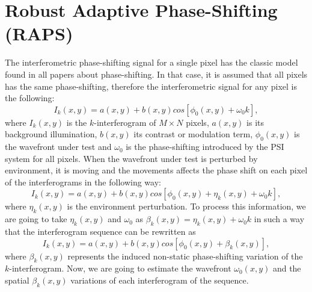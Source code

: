 \section{Robust Adaptive Phase-Shifting (RAPS)}
The interferometric phase-shifting signal for a single pixel has the classic
model found in all papers about phase-shifting. In that case, it is assumed that
all pixels has the same phase-shifting, therefore the interferometric signal for
any pixel is the following:
\begin{equation}
  I_k(x,y) = a(x,y)+b(x,y)cos[\phi_0(x,y) + \omega_0 k],
\end{equation}
where $I_k(x,y)$ is the $k$-interferogram of $M\times N$ pixels, $a(x,y)$ is its
background illumination, $b(x,y)$ its contrast or modulation term,
$\phi_0(x,y)$ is the wavefront under test and $\omega_0$ is the phase-shifting
introduced by the PSI system for all pixels. When the wavefront under test is
perturbed by environment, it is moving and the movements affects the phase shift
on each pixel of the interferograms in the following way:
\begin{equation}
  I_k(x,y) = a(x,y)+b(x,y)cos[\phi_0(x,y) + \eta_k(x,y) + \omega_0 k],
\end{equation}
where $\eta_k(x,y)$ is the environment perturbation. To process this
information, we are going to take $\eta_k(x,y)$ and $\omega_0$ as $\beta_k(x,y)
= \eta_k(x,y) + \omega_0 k$ in such a way that the interferogram sequence
can be rewritten as
\begin{equation}
  I_k(x,y) = a(x,y)+b(x,y)cos[\phi_0(x,y) + \beta_k(x,y)],
\end{equation}
where $\beta_k(x,y)$ represents the induced non-static phase-shifting variation
of the $k$-interferogram. Now, we are going to estimate the wavefront
$\omega_0(x,y)$ and the spatial $\beta_k(x,y)$ variations of each interferogram
of the sequence.

